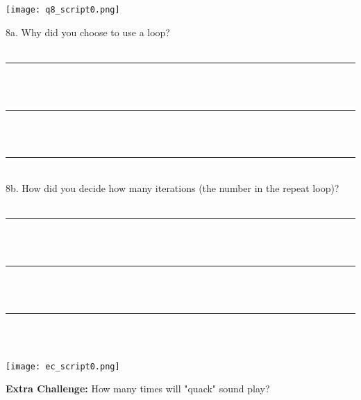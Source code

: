 \begin{center}
\texttt{[image: q8\_script0.png]}
\end{center}

\noindent 8a. Why did you choose to use a loop? \\ \\
\noindent \rule{18.5cm}{0.5pt} \\ \\
\noindent \rule{18.5cm}{0.5pt} \\ \\
\noindent \rule{18.5cm}{0.5pt} \\

\noindent 8b. How did you decide how many iterations (the number in the repeat loop)? \\ \\
\noindent \rule{18.5cm}{0.5pt} \\ \\
\noindent \rule{18.5cm}{0.5pt} \\ \\
\noindent \rule{18.5cm}{0.5pt} \\

\noindent \dotfill \\
\begin{center}
\texttt{[image: ec\_script0.png]}
\end{center}

\noindent \textbf{Extra Challenge:} How many times will "quack" sound play? \numbox
